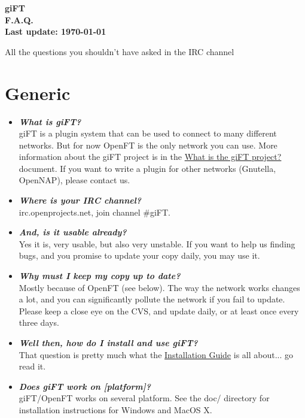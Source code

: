 \documentclass[10pt]{article}
\newcommand{\question}[1]{\item\textbf{\emph{#1}}}
\begin{document}
\begin{center}
\textsf{\textbf{\Huge{giFT} \\ \huge{F.A.Q.} \\
\normalsize{Last update: \today}}}
\end{center}

\begin{center}
All the questions you shouldn't have asked in the IRC channel
\end{center}

\tableofcontents

\setlength{\parskip}{1.4ex}

\section{Generic}
\begin{itemize}

\question {What is giFT?}\\
giFT is a plugin system that can be used to connect to many
different networks.  But for now OpenFT is the only network you
can use. More information about the giFT project is in the
\href{http://gift.sourceforge.net/docs/?document=whatis.html}{What
is the giFT project?} document. If you want to write a plugin for
other networks (Gnutella, OpenNAP), please contact us.  

\question {Where is your IRC channel?}\\
irc.openprojects.net, join channel \#giFT. 

\question {And, is it usable already?}\\
Yes it is, very usable, but also very unstable. If you want to
help us finding bugs, and you promise to update your copy daily,
you may use it.

\question {Why must I keep my copy up to date?}\\
Mostly because of OpenFT (see below). The way the network works
changes a lot, and you can significantly pollute the network if
you fail to update. Please keep a close eye on the CVS, and update
daily, or at least once every three days. 

\question {Well then, how do I install and use giFT?}\\
That question is pretty much what the
\href{http://gift.sourceforge.net/docs/?document=install.html}{Installation
Guide} is all about... go read it.

\question {Does giFT work on [platform]?}\\
giFT/OpenFT works on several platform.  See the doc/ directory for
installation instructions for Windows and MacOS X.


\end{itemize}
\end{document}
